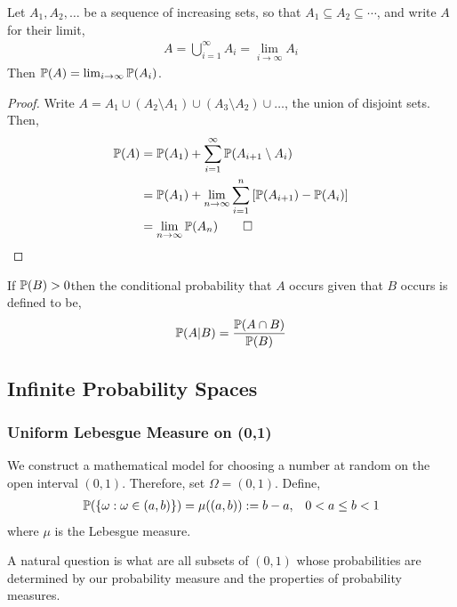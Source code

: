 \documentclass[12pt]{article}
\begin{document}
\begin{lemma}
Let \( A_1, A_2, \ldots  \) be a sequence of increasing sets, so that \( A_1 \subseteq A_2 \subseteq \cdots  \), and write \( A \) for their limit,
\begin{align*}
    A = \bigcup_{i=1}^{\infty} A_i = \lim_{i\to\infty}A_i
\end{align*}
Then \( \mathbb{P}(A) = \lim_{i\to\infty} \mathbb{P}(A_i) \).
\end{lemma}

\begin{proof}
Write \( A = A_1 \cup (A_2\setminus A_1)\cup (A_3\setminus A_2) \cup \ldots \), the union of disjoint sets. Then,
\begin{align*}
    \PP(A) &= \PP(A_1) + \sum_{i=1}^{\infty} \PP(A_{i+1} \setminus A_{i}) \\
    &= \PP(A_1) + \lim_{n\to\infty} \sum_{i=1}^{n} \left[ \PP(A_{i+1}) - \PP(A_i) \right] \\
    &= \lim_{n\to\infty} \PP(A_n) \tag*{\qed}
\end{align*}
\end{proof}

\begin{definition}
If \( \mathbb{P}(B) > 0 \)then the conditional probability that \( A \) occurs given that \( B \) occurs is defined  to be,
\begin{align*}
    \mathbb{P}(A | B) = \dfrac{\mathbb{P}(A\cap B)}{\mathbb{P}(B)}
\end{align*}
\end{definition}


\subsection{Infinite Probability Spaces}

\subsubsection{Uniform Lebesgue Measure on (0,1)}
We construct a mathematical model for choosing a number at random on the open interval \( (0,1) \). Therefore, set \( \Omega = (0,1) \). Define,
\begin{align*}
     \mathbb{P}(\{\omega: \omega\in(a,b)\}) = \mu((a,b)) := b-a, && 0<a\leq b< 1
\end{align*}
where \( \mu \) is the Lebesgue measure.

A natural question is what are all subsets of \( (0,1) \) whose probabilities are determined by our probability measure and the properties of probability measures.
\end{document}
